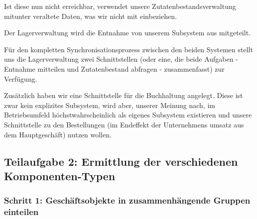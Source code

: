 Ist diese nun nicht erreichbar, verwendet unsere Zutatenbestandsverwaltung
mitunter veraltete Daten, was wir nicht mit einbeziehen.

Der Lagerverwaltung wird die Entnahme von unserem Subsystem aus mitgeteilt.

F\"ur den kompletten Synchronisationsprozess zwischen den beiden Systemen
stellt uns die Lagerverwaltung zwei Schnittstellen (oder eine, die beide
Aufgaben - Entnahme mitteilen und Zutatenbestand abfragen - zusammenfasst)
zur Verf\"ugung.

Zus\"atzlich haben wir eine Schnittstelle f\"ur die Buchhaltung angelegt.
Diese ist zwar kein explizites Subsystem, wird aber, unserer Meinung nach,
im Betriebsumfeld h\"ochstwahrscheinlich als eigenes Subsystem existieren
und unsere Schnittstelle zu den Bestellungen (im Endeffekt der Unternehmens\-
umsatz aus dem Hauptgesch\"aft) nutzen wollen.



\subsection{Teilaufgabe 2: Ermittlung der verschiedenen Komponenten-Typen}

\subsubsection{Schritt 1: Gesch\"aftsobjekte in zusammenh\"angende Gruppen einteilen}

